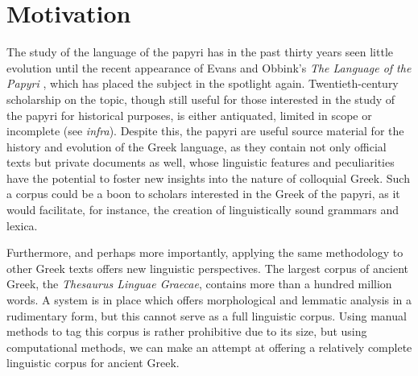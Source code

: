 
\section{Motivation}

The study of the language of the papyri has in the past thirty years
seen little evolution until the recent appearance of Evans and Obbink's
\textit{The Language of the Papyri} \citep{lpapyri}, which has placed
the subject in the spotlight again. Twentieth-century scholarship on the
topic, though still useful for those interested in the study of the
papyri for historical purposes, is either antiquated, limited in scope
or incomplete (see \textit{infra}). Despite this, the papyri are
useful source material for the history and evolution of the Greek
language, as they contain not only official texts but private
documents as well, whose linguistic features and peculiarities have
the potential to foster new insights into the nature of colloquial
Greek. Such a corpus could be a boon to scholars interested in the
Greek of the papyri, as it would facilitate, for instance, the
creation of linguistically sound grammars and lexica.

Furthermore, and perhaps more importantly, applying the same
methodology to other Greek texts offers new linguistic
perspectives. The largest corpus of ancient Greek, the \textit{Thesaurus
Linguae Graecae}, contains more than a hundred million words.  A system
is in place which offers morphological and lemmatic analysis in a
rudimentary form, but this cannot serve as a full linguistic
corpus. Using manual methods to tag this corpus is rather prohibitive
due to its size, but using computational methods, we can make an
attempt at offering a relatively complete linguistic corpus for
ancient Greek.

